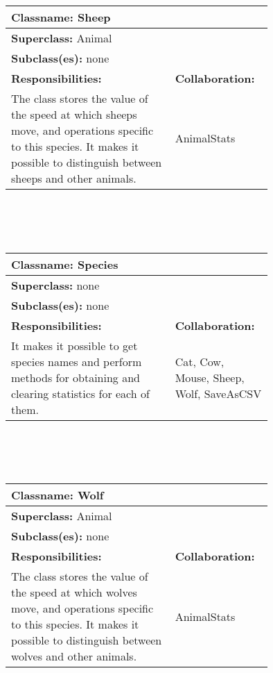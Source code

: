 \documentclass{article}
\begin{document}
\\ \\ \\
\begin{tabular}{|p{0.55\linewidth}|p{0.2\linewidth}|}
\hline
\multicolumn{2}{|l|}{\textbf{Classname:} Sheep} \\
\hline
\multicolumn{2}{|l|}{\textbf{Superclass:} Animal} \\
\multicolumn{2}{|l|}{\textbf{Subclass(es):} none} \\
\hline
\textbf{Responsibilities:}  &  \textbf{Collaboration:} \\
The class stores the value of the speed at which sheeps move, and operations specific to this species. It makes it possible to distinguish between sheeps and other animals. & AnimalStats \\
\hline
\end{tabular}
\\ \\ \\
\begin{tabular}{|p{0.55\linewidth}|p{0.2\linewidth}|}
\hline
\multicolumn{2}{|l|}{\textbf{Classname:} Species} \\
\hline
\multicolumn{2}{|l|}{\textbf{Superclass:} none} \\
\multicolumn{2}{|l|}{\textbf{Subclass(es):} none} \\
\hline
\textbf{Responsibilities:}  &  \textbf{Collaboration:} \\
It makes it possible to get species names and perform methods for obtaining and clearing statistics for each of them. & Cat, Cow, Mouse, Sheep, Wolf, SaveAsCSV \\
\hline
\end{tabular}
\\ \\ \\
\begin{tabular}{|p{0.55\linewidth}|p{0.2\linewidth}|}
\hline
\multicolumn{2}{|l|}{\textbf{Classname:} Wolf} \\
\hline
\multicolumn{2}{|l|}{\textbf{Superclass:} Animal} \\
\multicolumn{2}{|l|}{\textbf{Subclass(es):} none} \\
\hline
\textbf{Responsibilities:}  &  \textbf{Collaboration:} \\
The class stores the value of the speed at which wolves move, and operations specific to this species. It makes it possible to distinguish between wolves and other animals. & AnimalStats \\
\hline
\end{tabular}
\end{document}
